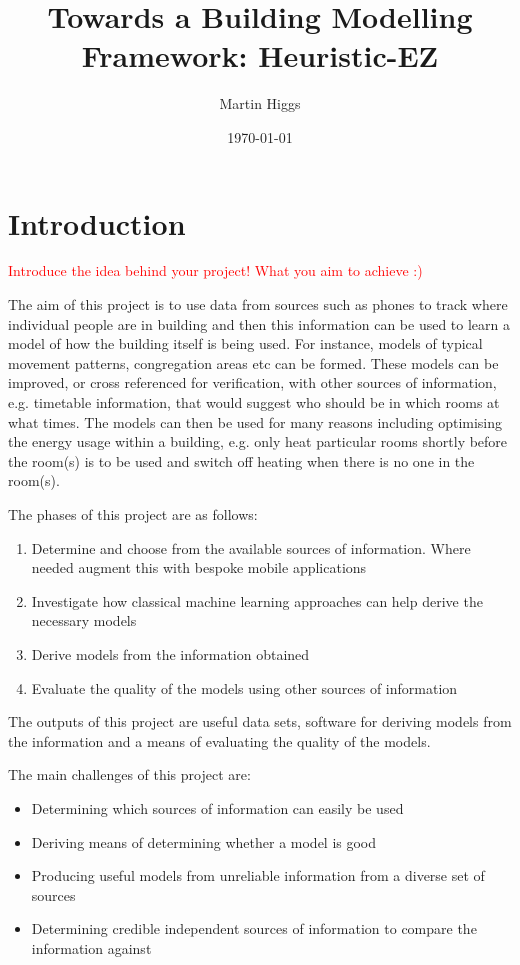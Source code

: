 \documentclass{UoYCSproject}
\title{Towards a Building Modelling Framework: Heuristic-EZ}
\author{Martin Higgs}
\date{\today}
\begin{document}
	
	\maketitle
	
	\chapter{Introduction}
    \label{chap:intro}
    
	    \textcolor{red}{Introduce the idea behind your project! What you aim to achieve :)}
    
		The aim of this project is to use data from sources such as phones to track where individual people are in building and then this information can be used to learn a model of how the building itself is being used. For instance, models of typical movement patterns, congregation areas etc can be formed. These models can be improved, or cross referenced for verification, with other sources of information, e.g. timetable information, that would suggest who should be in which rooms at what times. The models can then be used for many reasons including optimising the energy usage within a building, e.g. only heat particular rooms shortly before the room(s) is to be used and switch off heating when there is no one in the room(s).
		
		The phases of this project are as follows:
		\begin{enumerate}
			\item Determine and choose from the available sources of information. Where needed augment this with bespoke mobile applications
			\item Investigate how classical machine learning approaches can help derive the necessary models
			\item Derive models from the information obtained
			\item Evaluate the quality of the models using other sources of information
		\end{enumerate}
		The outputs of this project are useful data sets, software for deriving models from the information and a means of evaluating the quality of the models.
		
		The main challenges of this project are:
		\begin{itemize}
			\item Determining which sources of information can easily be used
			\item Deriving means of determining whether a model is good
			\item Producing useful models from unreliable information from a diverse set of sources
			\item Determining credible independent sources of information to compare the information against
		\end{itemize}
        
\end{document}
